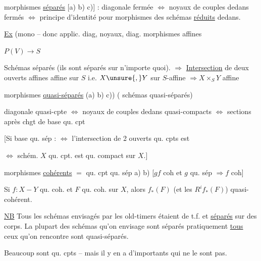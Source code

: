 morphismes \uline{séparés} [a) b) c)] : diagonale fermée $\Longleftrightarrow$ noyaux de couples dedans fermés $\Longleftrightarrow$ principe d'identité pour morphismes des schémas \uline{réduits} dedans.

\uline{Ex} (mono -- donc applic. diag, noyaux, diag. morphismes affines


$P(V)\longrightarrow S$

Schémas séparés (ils sont séparés sur n'importe quoi). $\Rightarrow$ \uline{Intersection}  de deux ouverts affines affine sur $S$ i.e. $X\unsure{,}Y$ sur $S$-affine $\Rightarrow X\times_S Y$ affine


morphismes \uline{quasi-séparés} (a) b) c)) ( schémas quasi-séparés)

diagonale quasi-cpte $\Longleftrightarrow$ noyaux de couples dedans quasi-compacts $\Longleftrightarrow$ sections après chgt de base qu. cpt

 [Si base qu. sép : $\Longleftrightarrow$  l'intersection de 2 ouverts qu. cpts est 


$\Longleftrightarrow$  schém.  $X$ qu. cpt. est qu. compact sur $X$.]


morphismes \uline{cohérents} $={}$ qu. cpt qu. sép \quad a) b) [$gf$ coh et $g$ qu. sép $\Rightarrow f$ coh]

Si $f:X\mathrel{-}Y$ qu. coh. et $F$ qu. coh. sur $X$, alors $f_*(F)$ (et les $R^i f_*(F)$) quasi-cohérent.


\uline{NB} Tous les schémas envisagés par les old-timers étaient de t.f. et \uline{séparés} sur des corps. La plupart des schémas qu'on envisage  sont séparés pratiquement \uline{tous} ceux qu'on rencontre sont quasi-séparés.

Beaucoup sont qu. cpts -- mais il y en a d'importants qui ne le sont pas.

